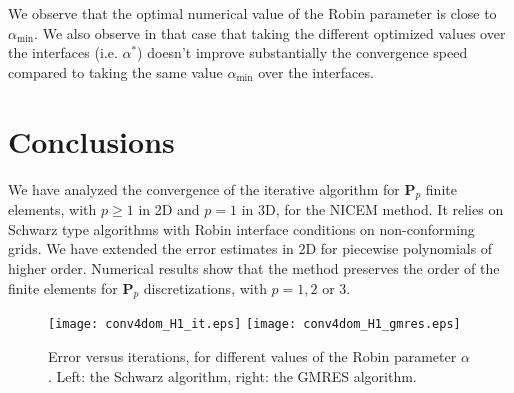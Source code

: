 \documentclass[final]{siamltex}
\begin{document}
We observe that the optimal numerical value of the Robin parameter is close to $\alpha_{\text{min}}$.
We also observe in that case that taking the different optimized values over the interfaces (i.e. $\alpha^*$)
doesn't improve substantially the convergence speed compared to taking the same value $\alpha_{\text{min}}$ over
the interfaces.
\section{Conclusions}
We have analyzed the convergence of the iterative algorithm
for ${\mathbf{P}}_p$ finite elements, with $p\ge 1$ in 2D and $p=1$ in 3D,
for the NICEM method. It relies on Schwarz type algorithms with Robin
interface conditions on non-conforming grids. We have extended the error estimates in 2D for piecewise polynomials
of higher order. Numerical results show that the method preserves the order of the finite elements
for ${\mathbf{P}}_p$ discretizations, with $p=1,2$ or $3$.

\begin{figure}[H]
  
  \hspace{-1.5cm}
  \texttt{[image: conv4dom\_H1\_it.eps]}\hspace{-0.7cm}
    \texttt{[image: conv4dom\_H1\_gmres.eps]}
    \caption{Error versus iterations, for different values of the Robin 
parameter $\alpha$. Left: the Schwarz algorithm, right: the GMRES algorithm.}
\label{fig:err4d}       
\end{figure}

\appendix
\end{document}
